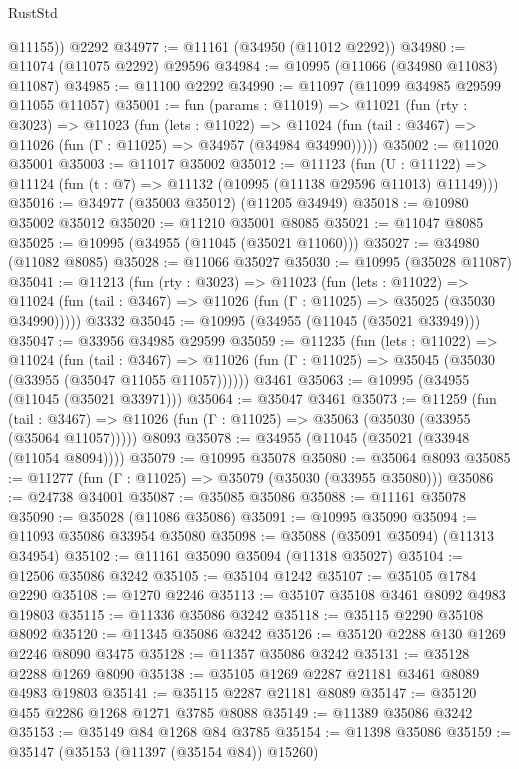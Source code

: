 \begin{lexlean}{RustStd}
\begin{coremodule}
        @11155))
    @2292
@34977 := @11161 (@34950 (@11012 @2292))
@34980 := @11074 (@11075 @2292) @29596
@34984 := @10995 (@11066 (@34980 @11083) @11087)
@34985 := @11100 @2292
@34990 := @11097 (@11099 @34985 @29599 @11055 @11057)
@35001 := fun (params : @11019) =>
  @11021
    (fun (rty : @3023) =>
    @11023
      (fun (lets : @11022) =>
      @11024 (fun (tail : @3467) => @11026 (fun (Γ : @11025) => @34957 (@34984 @34990)))))
@35002 := @11020 @35001
@35003 := @11017 @35002
@35012 := @11123
    (fun (U : @11122) => @11124 (fun (t : @7) => @11132 (@10995 (@11138 @29596 @11013) @11149)))
@35016 := @34977 (@35003 @35012) (@11205 @34949)
@35018 := @10980 @35002 @35012
@35020 := @11210 @35001 @8085
@35021 := @11047 @8085
@35025 := @10995 (@34955 (@11045 (@35021 @11060)))
@35027 := @34980 (@11082 @8085)
@35028 := @11066 @35027
@35030 := @10995 (@35028 @11087)
@35041 := @11213
    (fun (rty : @3023) =>
    @11023
      (fun (lets : @11022) =>
      @11024 (fun (tail : @3467) => @11026 (fun (Γ : @11025) => @35025 (@35030 @34990)))))
    @3332
@35045 := @10995 (@34955 (@11045 (@35021 @33949)))
@35047 := @33956 @34985 @29599
@35059 := @11235
    (fun (lets : @11022) =>
    @11024
      (fun (tail : @3467) =>
      @11026 (fun (Γ : @11025) => @35045 (@35030 (@33955 (@35047 @11055 @11057))))))
    @3461
@35063 := @10995 (@34955 (@11045 (@35021 @33971)))
@35064 := @35047 @3461
@35073 := @11259
    (fun (tail : @3467) => @11026 (fun (Γ : @11025) => @35063 (@35030 (@33955 (@35064 @11057)))))
    @8093
@35078 := @34955 (@11045 (@35021 (@33948 (@11054 @8094))))
@35079 := @10995 @35078
@35080 := @35064 @8093
@35085 := @11277 (fun (Γ : @11025) => @35079 (@35030 (@33955 @35080)))
@35086 := @24738 @34001
@35087 := @35085 @35086
@35088 := @11161 @35078
@35090 := @35028 (@11086 @35086)
@35091 := @10995 @35090
@35094 := @11093 @35086 @33954 @35080
@35098 := @35088 (@35091 @35094) (@11313 @34954)
@35102 := @11161 @35090 @35094 (@11318 @35027)
@35104 := @12506 @35086 @3242
@35105 := @35104 @1242
@35107 := @35105 @1784 @2290
@35108 := @1270 @2246
@35113 := @35107 @35108 @3461 @8092 @4983 @19803
@35115 := @11336 @35086 @3242
@35118 := @35115 @2290 @35108 @8092
@35120 := @11345 @35086 @3242
@35126 := @35120 @2288 @130 @1269 @2246 @8090 @3475
@35128 := @11357 @35086 @3242
@35131 := @35128 @2288 @1269 @8090
@35138 := @35105 @1269 @2287 @21181 @3461 @8089 @4983 @19803
@35141 := @35115 @2287 @21181 @8089
@35147 := @35120 @455 @2286 @1268 @1271 @3785 @8088
@35149 := @11389 @35086 @3242
@35153 := @35149 @84 @1268 @84 @3785
@35154 := @11398 @35086
@35159 := @35147 (@35153 (@11397 (@35154 @84)) @15260)

\end{coremodule}
\end{lexlean}
